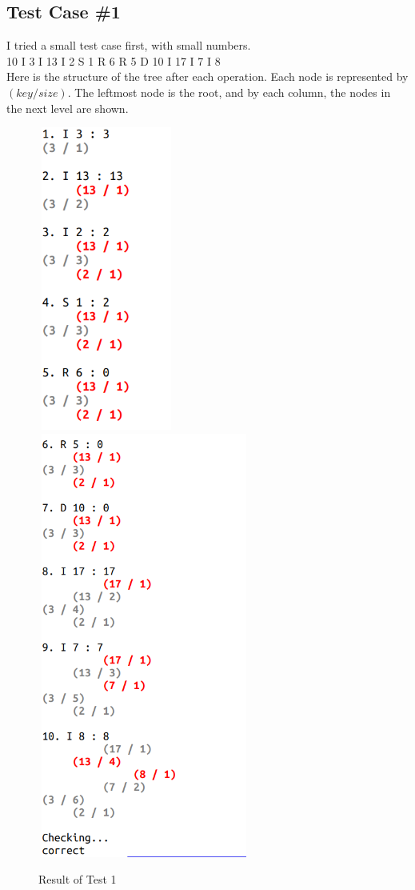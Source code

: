 \documentclass[12pt]{article}
\begin{document}
\subsection{Test Case \#1}
I tried a small test case first, with small numbers.\\
10\quad
I 3\quad
I 13\quad
I 2\quad
S 1\quad
R 6\quad
R 5\quad
D 10\quad
I 17\quad
I 7\quad
I 8\quad\\
Here is the structure of the tree after each operation.
Each node is represented by $(key / size)$. The leftmost node is the root, and by each column, the nodes in the next level are shown.
\pagebreak
\begin{figure}[h!]
	\begin{center}
		\includegraphics[width=4.5cm, height=10cm]{pic/test1-1.png}
		\includegraphics[width=7cm, height=14cm]{pic/test1-2.png}
		\caption{Result of Test 1}
	\end{center}

\end{figure}
\end{document}
